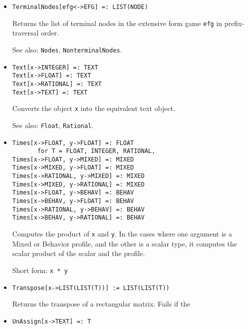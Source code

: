 \begin{itemize}
\item
\protect \large \begin{verbatim} 
TerminalNodes[efg<->EFG] =: LIST(NODE)
\end{verbatim}\normalsize

\bd
Returns the list of terminal nodes in the extensive form
game \verb+efg+ in prefix-traversal order.
\item
[See also:] {\tt Nodes}, {\tt NonterminalNodes}.
\ed

\item
\protect \large \begin{verbatim}
Text[x->INTEGER] =: TEXT
Text[x->FLOAT] =: TEXT
Text[x->RATIONAL] =: TEXT
Text[x->TEXT] =: TEXT
\end{verbatim} \normalsize

\bd
Converts the object \verb+x+ into the equivalent text object.
\item
[See also:] {\tt Float}, {\tt Rational}.
\ed

\item 
\protect \large \begin{verbatim}
Times[x->FLOAT, y->FLOAT] =: FLOAT
       for T = FLOAT, INTEGER, RATIONAL,
Times[x->FLOAT, y->MIXED] =: MIXED
Times[x->MIXED, y->FLOAT] =: MIXED
Times[x->RATIONAL, y->MIXED] =: MIXED
Times[x->MIXED, y->RATIONAL] =: MIXED
Times[x->FLOAT, y->BEHAV] =: BEHAV
Times[x->BEHAV, y->FLOAT] =: BEHAV
Times[x->RATIONAL, y->BEHAV] =: BEHAV
Times[x->BEHAV, y->RATIONAL] =: BEHAV
\end{verbatim} \normalsize
  
\bd
Computes the product of \verb+x+ and \verb+y+.  In the cases where one
argument is a Mixed or Behavior profile, and the other is a scalar
type, it computes the scalar product of the scalar and the profile. 
\item
[Short form:] \verb+x * y+
\ed

\item
\protect \large \begin{verbatim} 
Transpose[x->LIST(LIST(T))] := LIST(LIST(T))
\end{verbatim}\normalsize

\bd
Returns the transpose of a rectangular matrix. Fails if the 
\ed




\item
\protect \large \begin{verbatim}
UnAssign[x->TEXT] =: T
\end{verbatim}\normalsize


\end{itemize}
